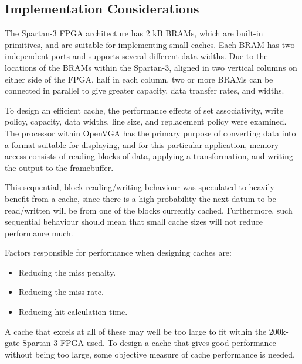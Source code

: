 % 

\subsection{Implementation Considerations}
The Spartan-3 FPGA architecture has 2 kB BRAMs, which are built-in primitives,
and are suitable for implementing small caches. Each BRAM has two independent
ports and supports several different data widths. Due to the locations of the
BRAMs within the Spartan-3, aligned in two vertical columns on either side of the
FPGA, half in each column, two or more BRAMs can be connected in parallel to give
greater capacity, data transfer rates, and widths.

To design an efficient cache, the performance effects of set associativity, write
policy, capacity, data widths, line size, and replacement policy were examined.
The processor within OpenVGA has the primary purpose of converting data into a
format suitable for displaying, and for this particular application, memory
access consists of reading blocks of data, applying a transformation, and writing
the output to the framebuffer.

This sequential, block-reading/writing behaviour was speculated to heavily
benefit from a cache, since there is a high probability the next datum to be
read/written will be from one of the blocks currently cached. Furthermore, such
sequential behaviour should mean that small cache sizes will not reduce
performance much.

Factors responsible for performance when designing caches are:
\begin{itemize}
	\item Reducing the miss penalty.
	\item Reducing the miss rate.
	\item Reducing hit calculation time.
\end{itemize}
A cache that excels at all of these may well be too large to fit within the
200k-gate Spartan-3 FPGA used. To design a cache that gives good performance
without being too large, some objective measure of cache performance is needed.

